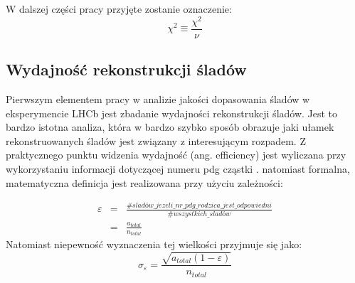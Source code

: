 W dalszej części pracy przyjęte zostanie oznaczenie:
\begin{equation}
\chi^2 \equiv \frac{\chi^2}{\nu} 
\end{equation}

\subsection{Wydajność rekonstrukcji śladów}
Pierwszym elementem pracy w analizie jakości dopasowania śladów w eksperymencie LHCb jest zbadanie wydajności rekonstrukcji śladów. Jest to bardzo istotna analiza, która w bardzo szybko sposób obrazuje jaki ułamek rekonstruowanych śladów jest związany z interesującym rozpadem. Z praktycznego punktu widzenia wydajność (ang. efficiency) jest wyliczana przy wykorzystaniu informacji dotyczącej numeru pdg cząstki \cite{PDG}. natomiast formalna, matematyczna definicja jest realizowana przy użyciu zależności:

\begin{eqnarray}
\varepsilon &=& \frac{\# sladów\_jezeli\_nr\_pdg\_rodzica\_jest\_odpowiedni }{\# wszystkich\_sladów} \\ \nonumber &=&\frac{a_{total}}{n_{total}}
\end{eqnarray}
Natomiast niepewność wyznaczenia tej wielkości przyjmuje się jako:
\begin{equation}
\sigma_{\varepsilon}=\frac{\sqrt{a_{total}(1-\varepsilon)}}{n_{total}}
\end{equation}

